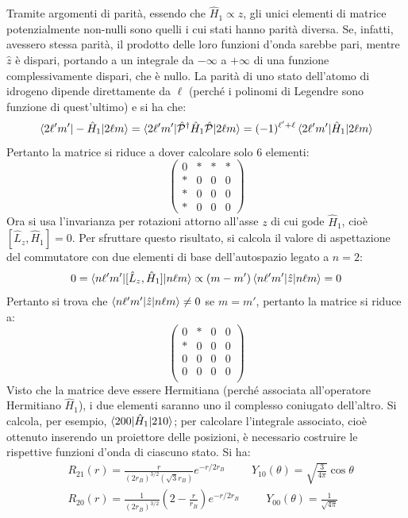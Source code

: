 \documentclass[11pt, a4paper]{scrartcl} %
\numberwithin{equation}{subsection}
\theoremstyle{style2}
\theoremstyle{style1}
\begin{document}
Tramite argomenti di parit\`a, essendo che $\hat{H}_1  \propto \hat{z}$, gli unici elementi di matrice potenzialmente non-nulli sono quelli i cui stati hanno parit\`a diversa.
Se, infatti, avessero stessa parit\`a, il prodotto delle loro funzioni d'onda sarebbe pari, mentre $\hat{z}$ \`e dispari, portando a un integrale da $-\infty$ a $+\infty$ di una funzione complessivamente dispari, che \`e nullo.
La parit\`a di uno stato dell'atomo di idrogeno dipende direttamente da $\ell $ (perch\'e i polinomi di Legendre sono funzione di quest'ultimo) e si ha che:
\[
\braket{2 \ell ' m'|-\hat{H}_1|2\ell m} = \braket{2\ell 'm'|\hat{\mathcal{P} }^\dagger \hat{H}_1 \hat{\mathcal{P} }|2 \ell m} = (-1)^{\ell '+\ell } \braket{2\ell 'm'|\hat{H}_1|2\ell m} 
\] 
Pertanto la matrice si riduce a dover calcolare solo $6$ elementi:
\[
	\begin{pmatrix} 0 & * &*&*\\ * &0&0&0\\ *&0&0&0\\ *&0&0&0\end{pmatrix} 
\] 
Ora si usa l'invarianza per rotazioni attorno all'asse $z$ di cui gode $\hat{H}_1$, cio\`e $[\hat{L}_z , \hat{H}_1 ] =  0$.
Per sfruttare questo risultato, si calcola il valore di aspettazione del commutatore con due elementi di base dell'autospazio legato a $n=2$:
\[
	0 = \braket{n\ell 'm'|[\hat{L}_z , \hat{H}_1]|n\ell m} \propto (m-m') \braket{n\ell 'm'|\hat{z}|n\ell m} =0
\] 
Pertanto si trova che $\braket{n\ell 'm'|\hat{z}|n\ell m} \neq 0$ se $m = m'$, pertanto la matrice si riduce a:
\begin{equation*}
	\begin{pmatrix} 
		0&*&0&0\\ 
		*&0&0&0\\ 
		0&0&0&0\\ 
		0&0&0&0\\ 
	\end{pmatrix} 
\end{equation*}
Visto che la matrice deve essere Hermitiana (perch\'e associata all'operatore Hermitiano $\hat{H}_1$), i due elementi saranno uno il complesso coniugato dell'altro.
Si calcola, per esempio, $\braket{200|\hat{H}_1|210} $; per calcolare l'integrale associato, cio\`e ottenuto inserendo un proiettore delle posizioni, \`e necessario costruire le rispettive funzioni d'onda di ciascuno stato.
Si ha:
\[
	\begin{split}
		&R_{21}(r) = \frac{r}{(2r_B)^{3 / 2} (\sqrt{3} r_B)}e^{-r / 2r_B}  \hspace{1cm}Y_{10}(\theta ) = \sqrt{\frac{3}{4\pi}} \cos \theta \\
		&R_{20}(r) = \frac{1}{(2r_B)^{3/2} }  \left(2 - \frac{r}{r_B}\right) e^{-r / 2r_B} \hspace{1cm} Y_{00}(\theta ) = \frac{1}{\sqrt{4\pi} }
	\end{split}
\] 
\end{document}
